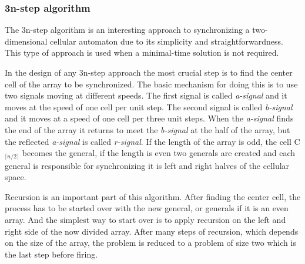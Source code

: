 \documentclass{article}
\begin{document}
\subsubsection{3n-step algorithm} \label{ssec:3nstep}

The 3n-step algorithm is an interesting approach to synchronizing a two-dimensional cellular automaton due to its simplicity and straightforwardness. This type of approach is used when a minimal-time solution is not required.

In the design of any 3n-step approach the most crucial step is to find the center cell of the array to be synchronized. The basic mechanism for doing this is to use two signals moving at different speeds. The first signal is called \textit{a-signal} and it moves at the speed of one cell per unit step. The second signal is called \textit{b-signal} and it moves at a speed of one cell per three unit steps. When the \textit{a-signal} finds the end of the array it returns to meet the \textit{b-signal} at the half of the array, but the reflected \textit{a-signal} is called \textit{r-signal}. If the length of the array is odd, the cell C$_{\lceil n/2 \rceil}$ becomes the general, if the length is even two generals are created and each general is responsible for synchronizing it is left and right halves of the cellular space. 



Recursion is an important part of this algorithm. After finding the center cell, the process has to be started over with the new general, or generals if it is an even array. And the simplest way to start over is to apply recursion on the left and right side of the now divided array. After many steps of recursion, which depends on the size of the array, the problem is reduced to a problem of size two which is the last step before firing.
\end{document}
